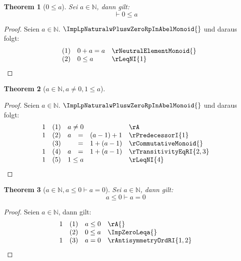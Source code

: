 \documentclass{book}
\theoremstyle{plain}
\newtheorem{theorem}{Theorem}
\theoremstyle{remark}
\theoremstyle{definition}
\begin{document}
\label{ImpZeroLeqa}
\begin{theorem}[\(0\leq a\)]
Sei \(a\in\mathbb{N}\), dann gilt:
\[\vdash 0\leq a\]
\end{theorem}
\begin{proof}
    Seien \(a\in\mathbb{N}\). \(\ImpLpNaturalwPluswZeroRpInAbelMonoid{}\) und daraus folgt:
        \[
	\begin{array}{llll}
            &  (1) & 0+a=a & \rNeutralElementMonoid{} \\
            &  (2) & 0\leq a & \rLeqNI{1} \\
    \end{array}
	\]
\end{proof}

\label{aInNaturalwaNotEqualsZerowOneLeqa}
\begin{theorem}[\(a\in\mathbb{N}, a\neq 0, 1\leq a\)]
\end{theorem}
\begin{proof}
    Seien \(a\in\mathbb{N}\). \(\ImpLpNaturalwPluswZeroRpInAbelMonoid{}\) und daraus folgt:
        \[
	\begin{array}{llclll}
         1   &  (1) & \multicolumn{3}{l}{a\neq 0} & \rA \\
         1   &  (2) & a&=&(a-1)+1 & \rPredecessorI{1} \\
             &  (3) & &=&1+(a-1) & \rCommutativeMonoid{} \\
         1   &  (4) & a&=&1+(a-1) & \rTransitivityEqRI{2,3} \\
         1   &  (5) & \multicolumn{3}{l}{1\leq a} & \rLeqNI{4} \\
    \end{array}
	\]
\end{proof}

\label{aInNaturalwaLeqZeroImpaEqualsZero}
\label{aLeqZeroImpaEqualsZero}
\begin{theorem}[\(a\in\mathbb{N},a\leq 0\vdash a=0\)]
Sei \(a\in\mathbb{N}\), dann gilt:
\[a\leq 0\vdash a=0\]
\end{theorem}
\begin{proof}
    Seien \(a\in\mathbb{N}\), dann gilt:
        \[
	\begin{array}{llll}
           1 &  (1) & a\leq 0 & \rA{} \\
             &  (2) & 0\leq a & \ImpZeroLeqa{} \\
           1 &  (3) & a=0 & \rAntisymmetryOrdRI{1,2} \\
    \end{array}
	\]
\end{proof}
\end{document}
